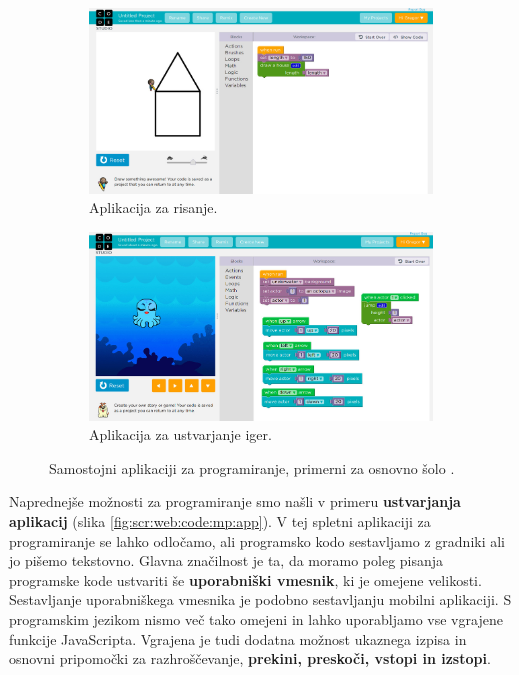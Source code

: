 \begin{figure}[h!]
  \centering
  \begin{subfigure}[]{0.45\textwidth}
    \includegraphics[width=\textwidth]{./images/sc_web/code_cs_draw.jpg}
    \caption{Aplikacija za risanje.}
  \label{fig:code:mp:draw}
\end{subfigure}
\qquad
\begin{subfigure}[]{0.45\textwidth}
  \includegraphics[width=\textwidth]{./images/sc_web/code_cs_game.jpg}
  \caption{Aplikacija za ustvarjanje iger.}
\label{fig:code:mp:game}
\end{subfigure}
\caption{Samostojni aplikaciji za programiranje, primerni za
  osnovno šolo \cite{web:code.org:studio}.}
\label{fig:web:code:mp:dg}
\end{figure}

Naprednejše možnosti za programiranje smo našli v primeru
\textbf{ustvarjanja aplikacij} (slika
\ref{fig:scr:web:code:mp:app}). V tej spletni aplikaciji za
programiranje se lahko odločamo, ali programsko kodo sestavljamo z
gradniki ali jo pišemo tekstovno. Glavna značilnost je ta, da moramo poleg
pisanja programske kode ustvariti še \textbf{uporabniški
  vmesnik}, ki je omejene velikosti. Sestavljanje uporabniškega
vmesnika je podobno sestavljanju mobilni aplikaciji. S programskim
jezikom nismo več tako omejeni in lahko uporabljamo vse vgrajene
funkcije JavaScripta. Vgrajena je tudi dodatna možnost ukaznega izpisa
in osnovni pripomočki za razhroščevanje, \textbf{prekini, preskoči,
  vstopi in izstopi}.

